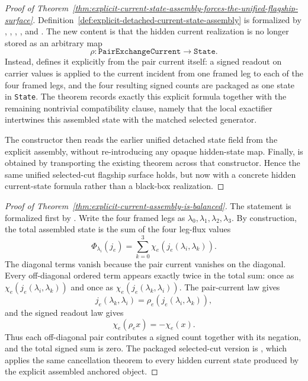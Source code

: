 \begin{proof}[Proof of Theorem~\ref{thm:explicit-current-state-assembly-forces-the-unified-flagship-surface}]
\label{proof:thm:explicit-current-state-assembly-forces-the-unified-flagship-surface}
Definition~\ref{def:explicit-detached-current-state-assembly} is formalized by
,
,
,
, and
. The new content is
that the hidden current realization is no longer stored as an arbitrary map
\[
\rho : \texttt{PairExchangeCurrent}\to\texttt{State}.
\]
Instead,  defines it explicitly from the
pair current itself: a signed readout on carrier values is applied to the
current incident from one framed leg to each of the four framed legs, and the
four resulting signed counts are packaged as one state in \texttt{State}. The
theorem  records exactly this
explicit formula together with the remaining nontrivial compatibility clause,
namely that the local exactifier intertwines this assembled state with the
matched selected generator.

The constructor
 then
reads the earlier unified detached state field from the explicit assembly,
without re-introducing any opaque hidden-state map. Finally,
 is obtained
by transporting the existing theorem
 across that
constructor. Hence the same unified selected-cut flagship surface holds, but
now with a concrete hidden current-state formula rather than a black-box
realization.
\end{proof}

\begin{proof}[Proof of Theorem~\ref{thm:explicit-current-assembly-is-balanced}]
\label{proof:thm:explicit-current-assembly-is-balanced}
The statement is formalized first by
. Write the four framed legs as
\(\lambda_0,\lambda_1,\lambda_2,\lambda_3\). By construction, the total
assembled state is the sum of the four leg-flux values
\[
\Phi_{\lambda_i}(j_e)
=
\sum_{k=0}^3 \chi_e(j_e(\lambda_i,\lambda_k)).
\]
The diagonal terms vanish because the pair current vanishes on the diagonal.
Every off-diagonal ordered term appears exactly twice in the total sum:
once as \(\chi_e(j_e(\lambda_i,\lambda_k))\) and once as
\(\chi_e(j_e(\lambda_k,\lambda_i))\). The pair-current law gives
\[
j_e(\lambda_k,\lambda_i)=\rho_e(j_e(\lambda_i,\lambda_k)),
\]
and the signed readout law gives
\[
\chi_e(\rho_e x)=-\chi_e(x).
\]
Thus each off-diagonal pair contributes a signed count together with its
negation, and the total signed sum is zero. The packaged selected-cut version
is ,
which applies the same cancellation theorem to every hidden current state
produced by the explicit assembled anchored object.
\end{proof}

